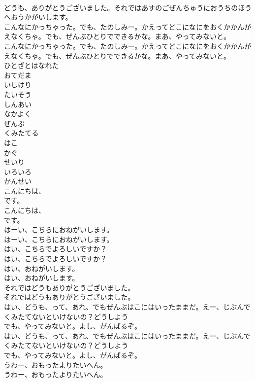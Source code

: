\documentclass[8pt]{extreport}
\begin{document}
\begin{CJK}{UTF8}{min}
\\	どうも、ありがとうございました。それではあすのごぜんちゅうにおうちのほうへおうかがいします。
\\	こんなにかっちゃった。でも、たのしみー。かえってどこになにをおくかかんがえなくちゃ。でも、ぜんぶひとりでできるかな。まあ、やってみないと。
\\	こんなにかっちゃった。でも、たのしみー。かえってどこになにをおくかかんがえなくちゃ。でも、ぜんぶひとりでできるかな。まあ、やってみないと。
\\	ひとざとはなれた
\\	おてだま
\\	いしけり
\\	たいそう
\\	しんあい
\\	なかよく
\\	ぜんぶ
\\	くみたてる
\\	はこ
\\	かぐ
\\	せいり
\\	いろいろ
\\	かんせい
\\	こんにちは、
\\	です。
\\	こんにちは、
\\	です。
\\	はーい、こちらにおねがいします。
\\	はーい、こちらにおねがいします。
\\	はい、こちらでよろしいですか？
\\	はい、こちらでよろしいですか？
\\	はい、おねがいします。
\\	はい、おねがいします。
\\	それではどうもありがとうございました。
\\	それではどうもありがとうございました。
\\	はい、どうも、って、あれ、でもぜんぶはこにはいったままだ。えー、じぶんでくみたてないといけないの？どうしよう
\\	でも、やってみないと。よし、がんばるぞ。
\\	はい、どうも、って、あれ、でもぜんぶはこにはいったままだ。えー、じぶんでくみたてないといけないの？どうしよう
\\	でも、やってみないと。よし、がんばるぞ。
\\	うわー、おもったよりたいへん。
\\	うわー、おもったよりたいへん。

\end{CJK}
\end{document}
